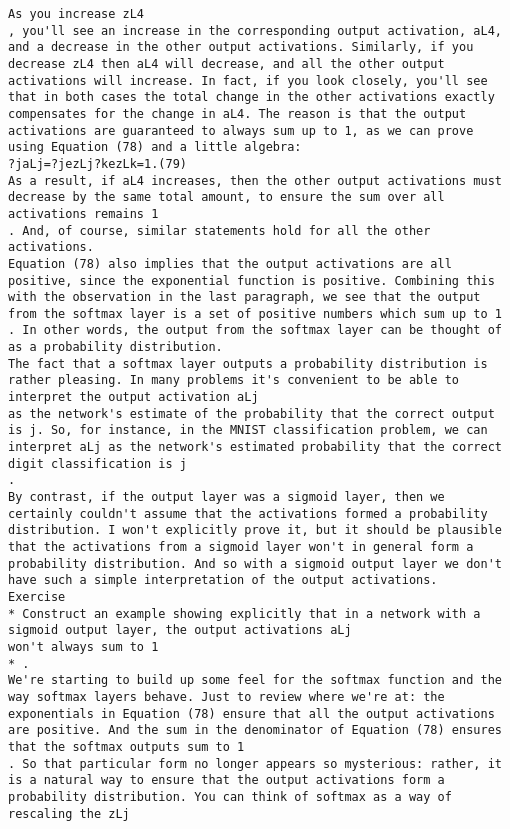 \begin{lstlisting}
As you increase zL4
, you'll see an increase in the corresponding output activation, aL4, and a decrease in the other output activations. Similarly, if you decrease zL4 then aL4 will decrease, and all the other output activations will increase. In fact, if you look closely, you'll see that in both cases the total change in the other activations exactly compensates for the change in aL4. The reason is that the output activations are guaranteed to always sum up to 1, as we can prove using Equation (78) and a little algebra: 
?jaLj=?jezLj?kezLk=1.(79)
As a result, if aL4 increases, then the other output activations must decrease by the same total amount, to ensure the sum over all activations remains 1
. And, of course, similar statements hold for all the other activations.
Equation (78) also implies that the output activations are all positive, since the exponential function is positive. Combining this with the observation in the last paragraph, we see that the output from the softmax layer is a set of positive numbers which sum up to 1
. In other words, the output from the softmax layer can be thought of as a probability distribution.
The fact that a softmax layer outputs a probability distribution is rather pleasing. In many problems it's convenient to be able to interpret the output activation aLj
as the network's estimate of the probability that the correct output is j. So, for instance, in the MNIST classification problem, we can interpret aLj as the network's estimated probability that the correct digit classification is j
.
By contrast, if the output layer was a sigmoid layer, then we certainly couldn't assume that the activations formed a probability distribution. I won't explicitly prove it, but it should be plausible that the activations from a sigmoid layer won't in general form a probability distribution. And so with a sigmoid output layer we don't have such a simple interpretation of the output activations.
Exercise
* Construct an example showing explicitly that in a network with a sigmoid output layer, the output activations aLj
won't always sum to 1
* . 
We're starting to build up some feel for the softmax function and the way softmax layers behave. Just to review where we're at: the exponentials in Equation (78) ensure that all the output activations are positive. And the sum in the denominator of Equation (78) ensures that the softmax outputs sum to 1
. So that particular form no longer appears so mysterious: rather, it is a natural way to ensure that the output activations form a probability distribution. You can think of softmax as a way of rescaling the zLj

\end{lstlisting}
